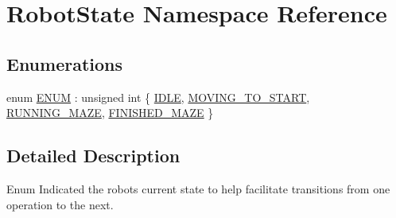 \hypertarget{namespaceRobotState}{\section{Robot\-State Namespace Reference}
\label{namespaceRobotState}
}
\subsection*{Enumerations}
\begin{DoxyCompactItemize}
\item 
enum \hyperlink{namespaceRobotState_a35861cd80d5e6a7efe93588700256f40}{E\-N\-U\-M} \-: unsigned int \{ \hyperlink{namespaceRobotState_a35861cd80d5e6a7efe93588700256f40a91b3fe8ec5cd16e28dc70cb3b28e8aea}{I\-D\-L\-E}, 
\hyperlink{namespaceRobotState_a35861cd80d5e6a7efe93588700256f40af7c91a1ca8daf629195b257b50e1b0b3}{M\-O\-V\-I\-N\-G\-\_\-\-T\-O\-\_\-\-S\-T\-A\-R\-T}, 
\hyperlink{namespaceRobotState_a35861cd80d5e6a7efe93588700256f40a92eb5d5907ee22a4889e4c3c5af7e49b}{R\-U\-N\-N\-I\-N\-G\-\_\-\-M\-A\-Z\-E}, 
\hyperlink{namespaceRobotState_a35861cd80d5e6a7efe93588700256f40a628c13a47b81ba00108da3c0f4097416}{F\-I\-N\-I\-S\-H\-E\-D\-\_\-\-M\-A\-Z\-E}
 \}
\end{DoxyCompactItemize}


\subsection{Detailed Description}
Enum Indicated the robots current state to help facilitate transitions from one operation to the next. 

